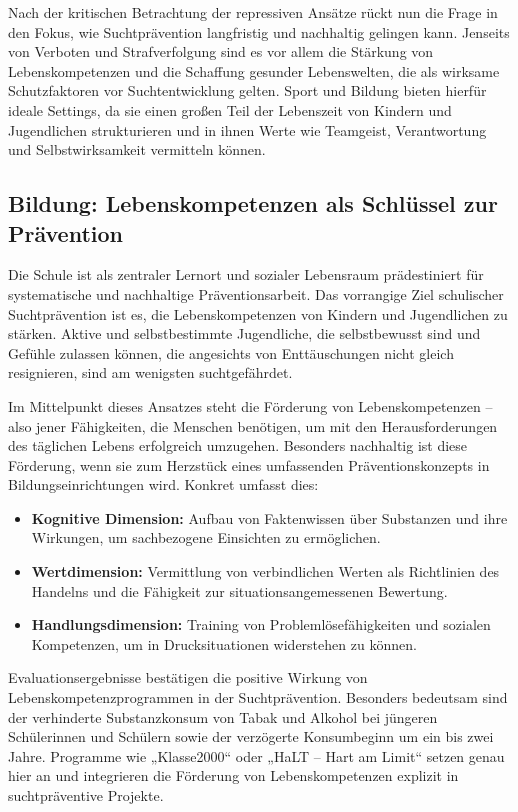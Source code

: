 \documentclass[11pt,a4paper]{article}
\begin{document}
	Nach der kritischen Betrachtung der repressiven Ansätze rückt nun die Frage in den Fokus, wie Suchtprävention langfristig und nachhaltig gelingen kann. Jenseits von Verboten und Strafverfolgung sind es vor allem die Stärkung von Lebenskompetenzen und die Schaffung gesunder Lebenswelten, die als wirksame Schutzfaktoren vor Suchtentwicklung gelten. Sport und Bildung bieten hierfür ideale Settings, da sie einen großen Teil der Lebenszeit von Kindern und Jugendlichen strukturieren und in ihnen Werte wie Teamgeist, Verantwortung und Selbstwirksamkeit vermitteln können.
	
	\subsection{Bildung: Lebenskompetenzen als Schlüssel zur Prävention}
	
	Die Schule ist als zentraler Lernort und sozialer Lebensraum prädestiniert für systematische und nachhaltige Präventionsarbeit. Das vorrangige Ziel schulischer Suchtprävention ist es, die Lebenskompetenzen von Kindern und Jugendlichen zu stärken\cite{school-prevention}. Aktive und selbstbestimmte Jugendliche, die selbstbewusst sind und Gefühle zulassen können, die angesichts von Enttäuschungen nicht gleich resignieren, sind am wenigsten suchtgefährdet\cite{school-prevention}.
	
	Im Mittelpunkt dieses Ansatzes steht die Förderung von Lebenskompetenzen – also jener Fähigkeiten, die Menschen benötigen, um mit den Herausforderungen des täglichen Lebens erfolgreich umzugehen\cite{life-skills-bzga}. Besonders nachhaltig ist diese Förderung, wenn sie zum Herzstück eines umfassenden Präventionskonzepts in Bildungseinrichtungen wird\cite{life-skills-bzga}. Konkret umfasst dies:
	
	\begin{itemize}[leftmargin=*, noitemsep]
		\item \textbf{Kognitive Dimension:} Aufbau von Faktenwissen über Substanzen und ihre Wirkungen, um sachbezogene Einsichten zu ermöglichen.
		\item \textbf{Wertdimension:} Vermittlung von verbindlichen Werten als Richtlinien des Handelns und die Fähigkeit zur situationsangemessenen Bewertung.
		\item \textbf{Handlungsdimension:} Training von Problemlösefähigkeiten und sozialen Kompetenzen, um in Drucksituationen widerstehen zu können.
	\end{itemize}
	
	Evaluationsergebnisse bestätigen die positive Wirkung von Lebenskompetenzprogrammen in der Suchtprävention\cite{life-skills-evaluation}. Besonders bedeutsam sind der verhinderte Substanzkonsum von Tabak und Alkohol bei jüngeren Schülerinnen und Schülern sowie der verzögerte Konsumbeginn um ein bis zwei Jahre\cite{life-skills-evaluation}. Programme wie „Klasse2000“ oder „HaLT – Hart am Limit“ setzen genau hier an und integrieren die Förderung von Lebenskompetenzen explizit in suchtpräventive Projekte.
	
\end{document}
